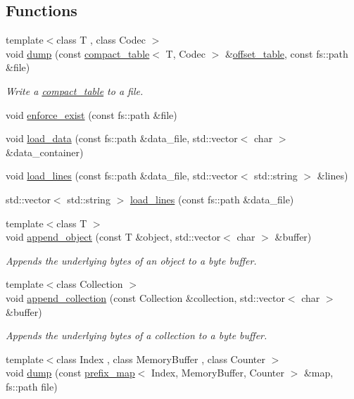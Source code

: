 \subsection*{Functions}
\begin{DoxyCompactItemize}
\item 
{\footnotesize template$<$class T , class Codec $>$ }\\void \mbox{\hyperlink{namespaceirk_1_1io_a6b755deadffffcc321eccc3c1a537555}{dump}} (const \mbox{\hyperlink{classirk_1_1compact__table}{compact\+\_\+table}}$<$ T, Codec $>$ \&\mbox{\hyperlink{namespaceirk_a3d7b00f359d122e0bf0f709d21f00098}{offset\+\_\+table}}, const fs\+::path \&file)
\begin{DoxyCompactList}\small\item\em Write a {\ttfamily \mbox{\hyperlink{classirk_1_1compact__table}{compact\+\_\+table}}} to a file. \end{DoxyCompactList}\item 
void \mbox{\hyperlink{namespaceirk_1_1io_aa9967d537be4185e88420785431fb63b}{enforce\+\_\+exist}} (const fs\+::path \&file)
\item 
void \mbox{\hyperlink{namespaceirk_1_1io_a2ec8cb8d9886450819cc9ee7ff2049ce}{load\+\_\+data}} (const fs\+::path \&data\+\_\+file, std\+::vector$<$ char $>$ \&data\+\_\+container)
\item 
void \mbox{\hyperlink{namespaceirk_1_1io_af4c16c7d4b0a5323130f2b8dd2be8462}{load\+\_\+lines}} (const fs\+::path \&data\+\_\+file, std\+::vector$<$ std\+::string $>$ \&lines)
\item 
std\+::vector$<$ std\+::string $>$ \mbox{\hyperlink{namespaceirk_1_1io_af11c57444a8b26150af8c6cbaa8ef093}{load\+\_\+lines}} (const fs\+::path \&data\+\_\+file)
\item 
{\footnotesize template$<$class T $>$ }\\void \mbox{\hyperlink{namespaceirk_1_1io_a6b56c2c88f08eba5647f662fe701be3c}{append\+\_\+object}} (const T \&object, std\+::vector$<$ char $>$ \&buffer)
\begin{DoxyCompactList}\small\item\em Appends the underlying bytes of an object to a byte buffer. \end{DoxyCompactList}\item 
{\footnotesize template$<$class Collection $>$ }\\void \mbox{\hyperlink{namespaceirk_1_1io_ae89e77960d5da14cd0068835eaa3a442}{append\+\_\+collection}} (const Collection \&collection, std\+::vector$<$ char $>$ \&buffer)
\begin{DoxyCompactList}\small\item\em Appends the underlying bytes of a collection to a byte buffer. \end{DoxyCompactList}\item 
{\footnotesize template$<$class Index , class Memory\+Buffer , class Counter $>$ }\\void \mbox{\hyperlink{namespaceirk_1_1io_a4b74cc5a440f69992ce2302aebfc0b4d}{dump}} (const \mbox{\hyperlink{classirk_1_1prefix__map}{prefix\+\_\+map}}$<$ Index, Memory\+Buffer, Counter $>$ \&map, fs\+::path file)
\end{DoxyCompactItemize}


